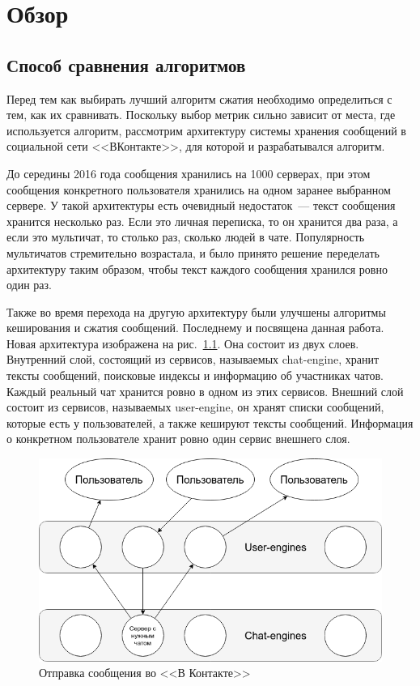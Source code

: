 \chapter{Обзор}

\section{Способ сравнения алгоритмов}

Перед тем как выбирать лучший алгоритм сжатия необходимо определиться с тем, как их сравнивать.
 Поскольку выбор метрик сильно зависит от места, где используется алгоритм, рассмотрим архитектуру 
 системы хранения сообщений в социальной сети <<ВКонтакте>>, для которой и разрабатывался алгоритм.

До середины 2016 года сообщения хранились на 1000 серверах, при этом сообщения конкретного
 пользователя хранились на одном заранее выбранном сервере. У такой архитектуры есть очевидный 
 недостаток~--- текст сообщения хранится несколько раз. Если это личная переписка, то он хранится
  два раза, а если это мультичат, то столько раз, сколько людей в чате. Популярность мультичатов
  стремительно возрастала, и было 
  принято решение переделать архитектуру таким образом, чтобы текст каждого сообщения хранился 
  ровно один раз.

 Также во время перехода на другую архитектуру были улучшены алгоритмы кеширования
   и сжатия сообщений. Последнему и посвящена данная работа.
Новая архитектура изображена на рис.~\ref{fig10}. Она состоит из двух слоев. Внутренний слой, состоящий из
 сервисов, называемых chat-engine, хранит тексты сообщений, поисковые индексы и информацию об
  участниках чатов. Каждый реальный чат хранится ровно в одном из этих сервисов. Внешний слой состоит
   из сервисов, называемых user-engine, он хранят списки сообщений, которые есть у пользователей,
    а также кешируют тексты сообщений. Информация о конкретном пользователе хранит ровно один 
    сервис внешнего слоя. 

\begin{figure}[h!]
  \includegraphics[width=6in]{pics/messages-structure.png}
  \caption{Отправка сообщения во <<В Контакте>>}
  \label{fig10}
\end{figure}


